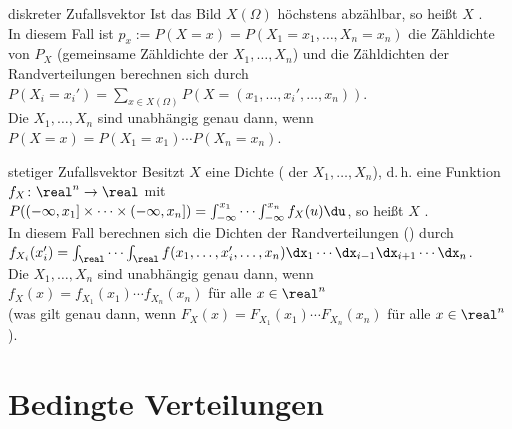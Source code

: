 \begin{Def}{diskreter Zufallsvektor}
    Ist das Bild $X(\Omega)$ höchstens abzählbar, so heißt $X$ .\\
    In diesem Fall ist $p_x := P(X = x) = P(X_1 = x_1, \dotsc, X_n = x_n)$ die
    Zähldichte von $P_X$ (gemeinsame Zähldichte der $X_1, \dotsc, X_n$) und
    die Zähldichten der Randverteilungen berechnen sich durch
    $P(X_i = x_i') = \sum_{x \in X(\Omega)} P(X = (x_1, \dotsc, x_i', \dotsc, x_n))$.\\
    Die $X_1, \dotsc, X_n$ sind unabhängig genau dann, wenn
    $P(X = x) = P(X_1 = x_1) \dotsm P(X_n = x_n)$.
\end{Def}

\begin{Def}{stetiger Zufallsvektor}
    Besitzt $X$ eine Dichte
    ( der $X_1, \dotsc, X_n$),
    d.\,h. eine Funktion $f_X\colon \real^n \rightarrow \real$ mit\\
    $P((-\infty, x_1] \times \dotsb \times (-\infty, x_n]) =
    \int_{-\infty}^{x_1} \dotsb \int_{-\infty}^{x_n} f_X(u)\du$,
    so heißt $X$ .\\
    In diesem Fall berechnen sich die Dichten der Randverteilungen () durch\\
    $f_{X_i}(x_i') = \int_\real \dotsb \int_\real
    f(x_1, \dotsc, x_i', \dotsc, x_n) \dx_1 \dotsb \dx_{i-1} \dx_{i+1} \dotsb \dx_n$.\\
    Die $X_1, \dotsc, X_n$ sind unabhängig genau dann, wenn
    $f_X(x) = f_{X_1}(x_1) \dotsm f_{X_n}(x_n)$ für alle $x \in \real^n$\\
    (was gilt genau dann, wenn $F_X(x) = F_{X_1}(x_1) \dotsm F_{X_n}(x_n)$
    für alle $x \in \real^n$).
\end{Def}

\pagebreak

\section{%
    Bedingte Verteilungen%
}

